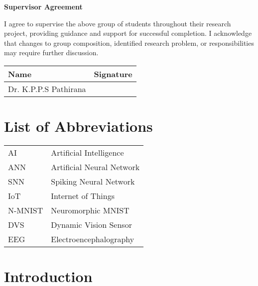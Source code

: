 \documentclass[a4paper,12pt]{article}
\begin{document}
	\vspace{0.5cm}
	
	
	
	{\normalsize \textbf{Supervisor Agreement} \par}
	{\normalsize I agree to supervise the above group of students throughout their research project, providing guidance and support for successful completion. I acknowledge that changes to group composition, identified research problem, or responsibilities may require further discussion. \par}
	\vspace{0.5cm}
	\begin{tabularx}{\textwidth}{|X|X|}
		\hline
		\textbf{Name} & \textbf{Signature} \\
		\hline
		Dr. K.P.P.S Pathirana & \\
		\hline
	\end{tabularx}
	
	\cleardoublepage
	
	\tableofcontents
	\cleardoublepage
	
	\listoffigures
	\cleardoublepage
	
	\listoftables
	\cleardoublepage
	
	\section*{List of Abbreviations}
	\begin{tabular}{l l}
		AI & Artificial Intelligence \\
		ANN & Artificial Neural Network \\
		SNN & Spiking Neural Network \\
		IoT & Internet of Things \\
		N-MNIST & Neuromorphic MNIST \\
		DVS & Dynamic Vision Sensor \\
		EEG & Electroencephalography \\
	\end{tabular}
	\cleardoublepage
	
	
	\section{Introduction}
	
\end{document}

